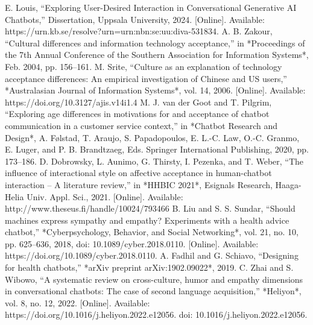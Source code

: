\documentclass[conference]{IEEEtran}
\begin{document}
\begin{thebibliography}{00}
	 E. Louis, ``Exploring User-Desired Interaction in Conversational Generative AI Chatbots,'' Dissertation, Uppsala University, 2024. [Online]. Available: https://urn.kb.se/resolve?urn=urn:nbn:se:uu:diva-531834.
     A. B. Zakour, ``Cultural differences and information technology acceptance,'' in *Proceedings of the 7th Annual Conference of the Southern Association for Information Systems*, Feb. 2004, pp. 156–161.
     M. Srite, ``Culture as an explanation of technology acceptance differences: An empirical investigation of Chinese and US users,'' *Australasian Journal of Information Systems*, vol. 14, 2006. [Online]. Available: https://doi.org/10.3127/ajis.v14i1.4
	 M. J. van der Goot and T. Pilgrim, ``Exploring age differences in motivations for and acceptance of chatbot communication in a customer service context,'' in *Chatbot Research and Design*, A. Følstad, T. Araujo, S. Papadopoulos, E. L.-C. Law, O.-C. Granmo, E. Luger, and P. B. Brandtzaeg, Eds. Springer International Publishing, 2020, pp. 173–186.
	 D. Dobrowsky, L. Aunimo, G. Thirsty, I. Pezenka, and T. Weber, ``The influence of interactional style on affective acceptance in human-chatbot interaction – A literature review,'' in *HHBIC 2021*, Esignals Research, Haaga-Helia Univ. Appl. Sci., 2021. [Online]. Available: http://www.theseus.fi/handle/10024/793466
	 B. Liu and S. S. Sundar, ``Should machines express sympathy and empathy? Experiments with a health advice chatbot,'' *Cyberpsychology, Behavior, and Social Networking*, vol. 21, no. 10, pp. 625–636, 2018, doi: 10.1089/cyber.2018.0110. [Online]. Available: https://doi.org/10.1089/cyber.2018.0110.
	 A. Fadhil and G. Schiavo, ``Designing for health chatbots,'' *arXiv preprint arXiv:1902.09022*, 2019.
	 C. Zhai and S. Wibowo, ``A systematic review on cross-culture, humor and empathy dimensions in conversational chatbots: The case of second language acquisition,'' *Heliyon*, vol. 8, no. 12, 2022. [Online]. Available: https://doi.org/10.1016/j.heliyon.2022.e12056. doi: 10.1016/j.heliyon.2022.e12056.
\end{thebibliography}
\end{document}
